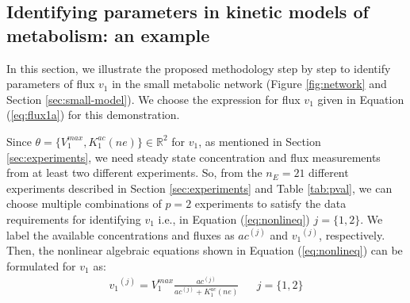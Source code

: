 \documentclass[10pt]{article}
\begin{document}
	\subsection{Identifying parameters in kinetic models of metabolism: an example}\label{sec:example}	
	In this section, we illustrate the proposed methodology step by step to identify parameters of flux $v_1$ in the small metabolic network (Figure \ref{fig:network} and Section \ref{sec:small-model}). We choose the expression for flux $v_1$ given in Equation (\ref{eq:flux1a}) for this demonstration. 
	
	Since $\theta = \{V_1^{max}, K_1^{ac} (ne)\} \in \mathbb{R}^2$ for $v_1$, as mentioned in Section \ref{sec:experiments}, we need steady state concentration and flux measurements from at least two different experiments. So, from the $n_E = 21$ different experiments described in Section \ref{sec:experiments} and Table \ref{tab:pval}, we can choose multiple combinations of $p = 2$ experiments to satisfy the data requirements for identifying $v_1$ i.e., in Equation (\ref{eq:nonlineq}) $j = \{1, 2\}$. We label the available concentrations and fluxes as ${ac}^{(j)}$ and ${v_1}^{(j)}$, respectively. Then, the nonlinear algebraic equations shown in Equation (\ref{eq:nonlineq}) can be formulated for $v_1$ as:
	\begin{align*}%
	{v_1}^{(j)} = V_{1}^{max}\frac{ac^{(j)}}{ac^{(j)}+K_{1}^{ac}(ne)} &&  j=\{1, 2\}
	\end{align*}
	
\end{document}
